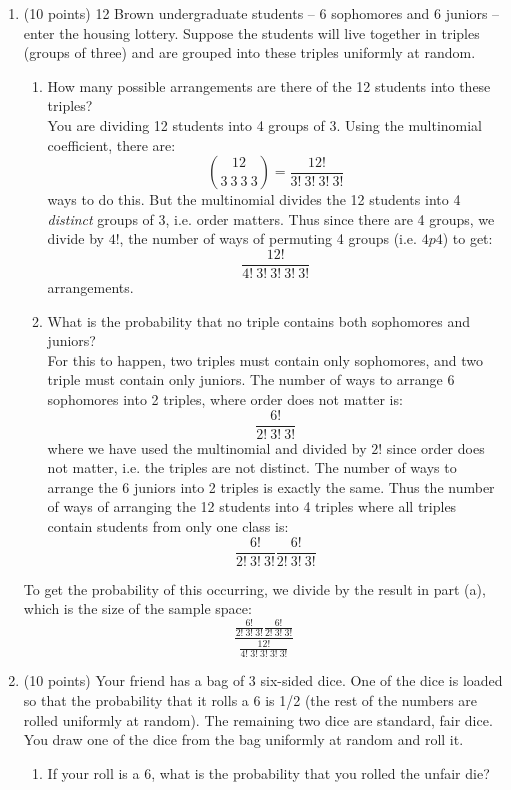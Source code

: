 \documentclass[12pt]{article}
\begin{document}
\begin{enumerate}
\item (10 points) 12 Brown undergraduate students -- 6 sophomores and 6 juniors -- enter the housing lottery. Suppose the students will live together in triples (groups of three) and are grouped into these triples uniformly at random.
\begin{enumerate}
\item How many possible arrangements are there of the 12 students into these triples?\\

You are dividing 12 students into 4 groups of 3. Using the multinomial coefficient, there are:
\[
\binom{12}{3\:3\:3\:3} = \frac{12!}{3!\:3!\:3!\:3!}
\]
ways to do this. But the multinomial divides the 12 students into 4 \emph{distinct} groups of 3, i.e. order matters. Thus since there are 4 groups, we divide by $4!$, the number of ways of permuting 4 groups (i.e. $4p4$) to get:
\[
\frac{12!}{4!\:3!\:3!\:3!\:3!}
\]
arrangements.
\item What is the probability that no triple contains both sophomores and juniors? \\
For this to happen, two triples must contain only sophomores, and two triple must contain only juniors. The number of ways to arrange 6 sophomores into 2 triples, where order does not matter is:
\[
\frac{6!}{2!\:3!\:3!}
\]
where we have used the multinomial and divided by $2!$ since order does not matter, i.e. the triples are not distinct. The number of ways to arrange the 6 juniors into 2 triples is exactly the same. Thus the number of ways of arranging the 12 students into 4 triples where all triples contain students from only one class is:
\[
\frac{6!}{2!\:3!\:3!}\frac{6!}{2!\:3!\:3!}
\]
\end{enumerate}
To get the probability of this occurring, we divide by the result in part (a), which is the size of the sample space:
\[
\dfrac{\frac{6!}{2!\:3!\:3!}\frac{6!}{2!\:3!\:3!}}{\frac{12!}{4!\:3!\:3!\:3!\:3!}}
\]

\pagebreak

\item (10 points) Your friend has a bag of 3 six-sided dice. One of the dice is loaded so that the probability that it rolls a 6 is 1/2 (the rest of the numbers are rolled uniformly at random). The remaining two dice are standard, fair dice. You draw one of the dice from the bag uniformly at random and roll it.
\begin{enumerate}
\item If your roll is a 6, what is the probability that you rolled the unfair die?\\


\end{enumerate}
\end{enumerate}
\end{document}
